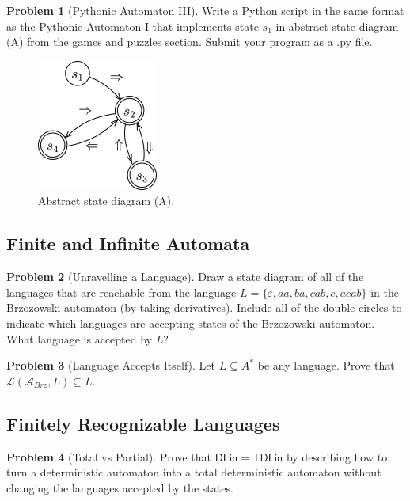 \documentclass[11pt]{article}
\theoremstyle{theorem} %
\theoremstyle{definition} %
\newtheorem{problem}                    {{\color{BurntOrange}Problem}}
\theoremstyle{remark} %
\begin{document}
\begin{problem}
    [Pythonic Automaton III]
    Write a Python script in the same format as the Pythonic Automaton I that implements state \(s_1\) in abstract state diagram (A) from the games and puzzles section. 
    Submit your program as a .py file.

    \begin{figure}[h]
        \centering
        \includegraphics{../imgs/reverseengineering.png}
        \caption{Abstract state diagram (A).}
    \end{figure}
\end{problem}

\subsection*{Finite and Infinite Automata}

\begin{problem}
    [Unravelling a Language]
    Draw a state diagram of all of the languages that are reachable from the language \(L = \{\varepsilon, aa, ba, cab, c, acab\}\) in the Brzozowski automaton (by taking derivatives). 
    Include all of the double-circles to indicate which languages are accepting states of the Brzozowski automaton.
    What language is accepted by \(L\)?
\end{problem}

\begin{problem}
    [Language Accepts Itself]
    Let \(L \subseteq A^*\) be any language. 
    Prove that \(\mathcal L(\mathcal A_{Brz}, L) \subseteq L\).
\end{problem}

\subsection*{Finitely Recognizable Languages}

\begin{problem}
    [Total vs Partial]
    Prove that \(\mathsf{DFin} = \mathsf{TDFin}\) by describing how to turn a deterministic automaton into a total deterministic automaton without changing the languages accepted by the states.
\end{problem}
\end{document}
